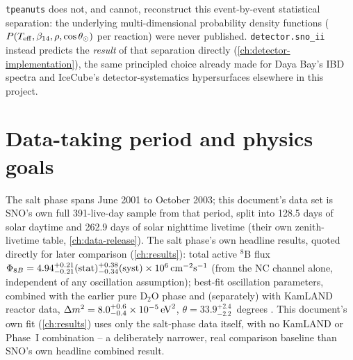 \begin{notebox}
\texttt{tpeanuts} does not, and cannot, reconstruct this event-by-event
statistical separation: the underlying multi-dimensional probability density
functions ($P(T_{\rm eff},\beta_{14},\rho,\cos\theta_\odot)$ per reaction) were
never published. \texttt{detector.sno\_ii} instead predicts the \emph{result}
of that separation directly (\cref{ch:detector-implementation}), the same
principled choice already made for Daya Bay's IBD spectra and IceCube's
detector-systematics hypersurfaces elsewhere in this project.
\end{notebox}

\section{Data-taking period and physics goals}

\begin{theorybox}
The salt phase spans June 2001 to October 2003; this document's data set is
SNO's own full 391-live-day sample from that period, split into 128.5 days
of solar daytime and 262.9 days of solar nighttime livetime (their own
zenith-livetime table, \cref{ch:data-release}). The salt phase's own
headline results, quoted directly for later comparison
(\cref{ch:results}): total active $^8$B flux
$\Phi_{8B}=4.94^{+0.21}_{-0.21}({\rm stat})^{+0.38}_{-0.34}({\rm syst})\times10^6\,{\rm
cm^{-2}s^{-1}}$ (from the NC channel alone, independent of any oscillation
assumption); best-fit oscillation parameters, combined with the earlier pure
D$_2$O phase and (separately) with KamLAND reactor data,
$\Delta m^2=8.0^{+0.6}_{-0.4}\times10^{-5}\,{\rm eV}^2$,
$\theta=33.9^{+2.4}_{-2.2}$~degrees \parencite{Aharmim2005SaltPhase}. This
document's own fit (\cref{ch:results}) uses only the salt-phase data itself,
with no KamLAND or Phase~I combination -- a deliberately narrower, real
comparison baseline than SNO's own headline combined result.
\end{theorybox}
